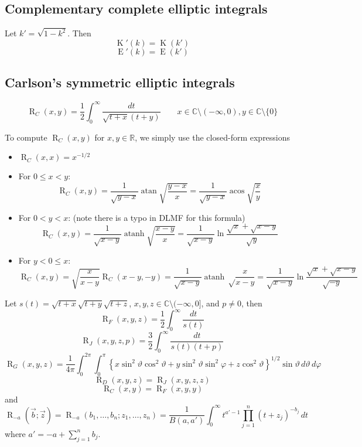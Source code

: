 \documentclass[10pt,dvipdfmx,letterpaper,twoside]{article}
\DeclareMathOperator{\acos}{acos}
\DeclareMathOperator{\atan}{atan}
\DeclareMathOperator{\atanh}{atanh}
\let\O=\operatorname
\newcommand{\RR}{{\mathbb{R}}}
\newcommand{\CC}{{\mathbb{C}}}
\newenvironment{implementation}{\noindent\begin{framed}}{\end{framed}}
\let\theta=\vartheta
\let\phi=\varphi
\begin{document}
\subsection{Complementary complete elliptic integrals}
Let $k' = \sqrt{1-k^2}$. Then
\[ \O{K}'(k) = \O{K}(k') \]
\[ \O{E}'(k) = \O{E}(k') \]

\subsection{Carlson's symmetric elliptic integrals}

\[ \O{R}_C(x,y) = \frac12 \int_0^\infty \frac{dt}{\sqrt{t+x}(t+y)} \qquad x\in\CC\setminus(-\infty,0), y\in\CC\setminus\{0\} \]

\begin{implementation}
To compute $\O{R}_C(x,y)$ for $x,y\in\RR$, we simply use the closed-form expressions
\begin{itemize}
\item $\O{R}_C(x,x) = x^{-1/2}$
\item For $0\leq x<y$:
    \[ \O{R}_C(x,y) = \frac{1}{\sqrt{y-x}}\atan\sqrt{\frac{y-x}{x}} = \frac{1}{\sqrt{y-x}}\acos\sqrt{\frac{x}{y}} \]
\item For $0<y<x$: (note there is a typo in DLMF for this formula)
    \[ \O{R}_C(x,y) = \frac{1}{\sqrt{x-y}}\atanh\sqrt{\frac{x-y}{x}} = \frac{1}{\sqrt{x-y}}\ln\frac{\sqrt{x} + \sqrt{x-y}}{\sqrt{y}} \]
\item For $y<0\leq x$:
    \[ \O{R}_C(x,y) = \sqrt{\frac{x}{x-y}} \O{R}_C(x-y,-y) = \frac{1}{\sqrt{x-y}}\atanh\sqrt\frac{x}{x-y} = \frac{1}{\sqrt{x-y}}\ln\frac{\sqrt{x}+\sqrt{x-y}}{\sqrt{-y}} \]
\end{itemize}
\end{implementation}

Let $s(t)=\sqrt{t+x}\sqrt{t+y}\sqrt{t+z}$, $x,y,z\in\CC\setminus(-\infty,0]$, and $p\neq0$, then
\[ \O{R}_F(x,y,z) = \frac{1}{2} \int_0^\infty \frac{dt}{s(t)} \]
\[ \O{R}_J(x,y,z,p) = \frac{3}{2} \int_0^\infty \frac{dt}{s(t)(t+p)} \]
\[ \O{R}_G(x,y,z) = \frac{1}{4\pi} \int_0^{2\pi}\int_0^\pi
  \left\{ x\sin^2\theta \cos^2\theta + y\sin^2\theta\sin^2\phi + z\cos^2\theta \right\}^{1/2}\sin\theta\,d\theta\,d\phi \]
\[ \O{R}_D(x,y,z) = \O{R}_J(x,y,z,z) \]
\[ \O{R}_C(x,y) = \O{R}_F(x,y,y) \]
and
\[ \O{R}_{-a}(\vec{b}; \vec{z}) = \O{R}_{-a}(b_1,\dots,b_n; z_1,\dots,z_n) = \frac{1}{B(a,a')}\int_0^\infty t^{a'-1} \prod_{j=1}^n(t+z_j)^{-b_j}\,dt \]
where $a' = -a + \sum_{j=1}^n b_j$.
\end{document}
